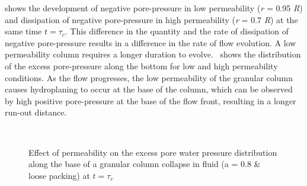  shows the development of negative pore-pressure in low 
permeability (\textit{r} = 0.95 \textit{R}) and dissipation of negative 
pore-pressure in high permeability (\textit{r} = 0.7 \textit{R}) at the same 
time $ t = \tau_c$. This difference in the quantity and the rate of dissipation 
of negative pore-pressure results in a difference in the rate of flow 
evolution. A low permeability column requires a longer duration to 
evolve.~ shows the distribution of the excess 
pore-pressure along the bottom for low and high permeability conditions. As the 
flow progresses, the low permeability of the granular column causes 
hydroplaning to occur at the base of the column, which can be observed by high 
positive pore-pressure at the base of the flow front, resulting in a longer 
run-out distance.
\begin{figure}
\centering
{}\\
\caption{Effect of permeability on the excess pore water pressure distribution 
along the base of a granular column collapse in fluid (a = 0.8 \& loose 
packing) at $t = \tau_c$}
\label{fig:Loose_PWP_ini}
\end{figure}

